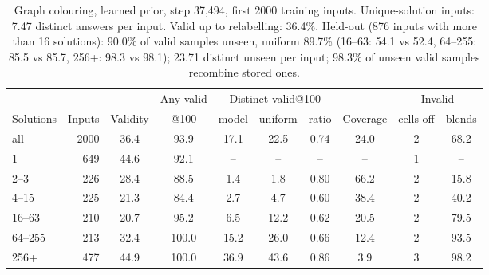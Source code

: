 \documentclass[11pt]{article}
\begin{document}
\begin{table}[H]
\centering\small
\begin{tabular}{@{}lrcccccccc@{}}
\toprule
& & & Any-valid & \multicolumn{3}{c}{Distinct valid@100} & & \multicolumn{2}{c}{Invalid} \\
\cmidrule(lr){5-7}\cmidrule(l){9-10}
Solutions & Inputs & Validity & @100 & model & uniform & ratio & Coverage & cells off & blends \\
\midrule
all & 2000 & 36.4 & 93.9 & 17.1 & 22.5 & 0.74 & 24.0 & 2 & 68.2 \\
1 & 649 & 44.6 & 92.1 & -- & -- & -- & -- & 1 & -- \\
2--3 & 226 & 28.4 & 88.5 & 1.4 & 1.8 & 0.80 & 66.2 & 2 & 15.8 \\
4--15 & 225 & 21.3 & 84.4 & 2.7 & 4.7 & 0.60 & 38.4 & 2 & 40.2 \\
16--63 & 210 & 20.7 & 95.2 & 6.5 & 12.2 & 0.62 & 20.5 & 2 & 79.5 \\
64--255 & 213 & 32.4 & 100.0 & 15.2 & 26.0 & 0.66 & 12.4 & 2 & 93.5 \\
256+ & 477 & 44.9 & 100.0 & 36.9 & 43.6 & 0.86 & 3.9 & 3 & 98.2 \\
\bottomrule
\end{tabular}
\caption{Graph colouring, learned prior, step 37{,}494, first 2000 training inputs. Unique-solution inputs: 7.47 distinct answers per input. Valid up to relabelling: 36.4\%. Held-out (876 inputs with more than 16 solutions): 90.0\% of valid samples unseen, uniform 89.7\% (16--63: 54.1 vs 52.4, 64--255: 85.5 vs 85.7, 256+: 98.3 vs 98.1); 23.71 distinct unseen per input; 98.3\% of unseen valid samples recombine stored ones.}
\end{table}
\end{document}
